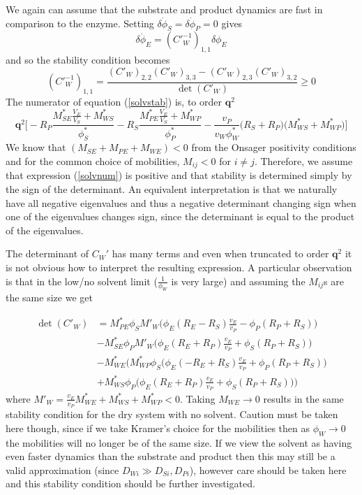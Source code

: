 We again can assume that the substrate and product dynamics are fast in comparison to the enzyme. Setting $\dot{\delta\phi_S}=\dot{\delta\phi_P}=0$ gives
\begin{equation}
    \dot{\delta\phi_E} = (C'_W^{-1})_{1, 1}\delta\phi_E
\end{equation}
and so the stability condition becomes
\begin{equation}
    (C'_W^{-1})_{1, 1} = \frac{(C'_W)_{2, 2}(C'_W)_{3, 3}-(C'_W)_{2, 3}(C'_W)_{3, 2}}{\det(C'_W)} \geq 0
    \label{solvstab}
\end{equation}
The numerator of equation (\ref{solvstab}) is, to order $\textbf{q}^2$
\begin{equation}
    \textbf{q}^2\Bigg[-R_P\frac{M_{SE}^*\frac{V_E}{V_S}+M_{WS}^*}{\phi_S^*}-R_S\frac{M_{PE}^*\frac{V_E}{V_S}+M_{WP}^*}{\phi_P^*}-\frac{v_P}{v_W\phi_W^*}\big(R_S+R_P\big)\big(M_{WS}^*+M_{WP}^*\big)\Bigg]
    \label{solvnum}
\end{equation}
We know that $(M_{SE}+M_{PE}+M_{WE})<0$ from the Onsager positivity conditions and for the common choice of mobilities, $M_{ij}<0$ for $i \neq j$. Therefore, we assume that expression (\ref{solvnum}) is positive and that stability is determined simply by the sign of the determinant. An equivalent interpretation is that we naturally have all negative eigenvalues and thus a negative determinant changing sign when one of the eigenvalues changes sign, since the determinant is equal to the product of the eigenvalues.

The determinant of $C_W'$ has many terms and even when truncated to order $\textbf{q}^2$ it is not obvious how to interpret the resulting expression. A particular observation is that in the low/no solvent limit ($\frac{1}{\phi_W}$ is very large) and assuming the $M_{ij}$s are the same size we get

\begin{equation}
\begin{split}
    \det(C'_W) &= M_{PE}^*\phi_SM'_W\big(\phi_E(R_E-R_S)\frac{v_E}{v_P}-\phi_P(R_P+R_S)\big)  \\
    &- M_{SE}^*\phi_PM'_W\big(\phi_E(R_E+R_P)\frac{v_E}{v_P}+\phi_S(R_P+R_S)\big) \\
    &- M_{WE}^*\Bigg(M_{WP}^*\phi_S\big(\phi_E(-R_E+R_S)\frac{v_E}{v_P}+\phi_P(R_P+R_S)) \\
    &+M_{WS}^*\phi_P\big(\phi_E(R_E+R_P)\frac{v_E}{v_P}+\phi_S(R_P+R_S))\Bigg)
\end{split}
\end{equation}
where $M'_W = \frac{v_E}{v_P}M_{WE}^*+M_{WS}^*+M_{WP}^* < 0$. Taking $M_{WE} \rightarrow 0$ results in the same stability condition for the dry system with no solvent. Caution must be taken here though, since if we take Kramer's choice for the mobilities then as $\phi_W \rightarrow 0$ the mobilities will no longer be of the same size. If we view the solvent as having even faster dynamics than the substrate and product then this may still be a valid approximation (since $D_{Wi} \gg D_{Si},D_{Pi}$), however care should be taken here and this stability condition should be further investigated.

